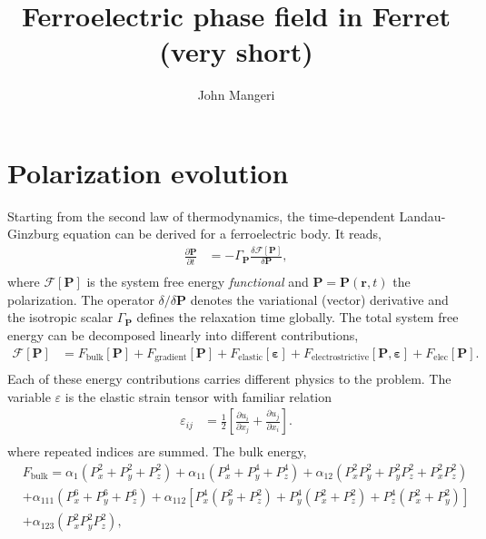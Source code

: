 \documentclass[paper=a4,14pt]{scrartcl} %
\title{Ferroelectric phase field in Ferret (very short)}
\author{John Mangeri}
\begin{document}
\maketitle

\section*{Polarization evolution}
Starting from the second law of thermodynamics, the time-dependent Landau-Ginzburg equation can be derived for a ferroelectric body. It reads,
%
\begin{align}\label{TDLGD}
\frac{\partial \textbf{P}}{\partial t}&= - \Gamma_\textbf{P} \frac{\delta \mathcal{F}[\textbf{P}]}{\delta \textbf{P}} , \\ \nonumber
\end{align}
%
where $\mathcal{F}[\textbf{P}]$ is the system free energy \emph{functional} and $\textbf{P} =  \textbf{P}(\textbf{r},t)$ the polarization. The operator $\delta/\delta \textbf{P}$ denotes the variational (vector) derivative and the isotropic scalar $\Gamma_\textbf{P}$ defines the relaxation time globally. The total system free energy can be decomposed linearly into different contributions,
%
\begin{align}\label{freeE}
\mathcal{F}[\textbf{P}] &= F_\mathrm{bulk}[\textbf{P}] + F_\mathrm{gradient}[\textbf{P}] + F_\mathrm{elastic}[\mathbf{\varepsilon}] + F_\mathrm{electrostrictive}[\textbf{P},\mathbf{\varepsilon}] + F_\mathrm{elec}[\textbf{P}].\\ \nonumber
\end{align}
%
Each of these energy contributions carries different physics to the problem. The variable $\varepsilon$ is the elastic strain tensor with familiar relation
%
\begin{align}\label{strain}
\varepsilon_{ij} &= \frac{1}{2} \left[\frac{\partial u_i}{\partial x_j} +\frac{\partial u_j}{\partial x_i}\right].\\ \nonumber
\end{align}
%
where repeated indices are summed. The bulk energy,
%
\begin{align}\label{bulk}
&F_\mathrm{bulk} =  \alpha_1 \left(P_x^2 + P_y^2 + P_z^2 \right) + \alpha_{11} \left(P_x^4 + P_y^4 + P_z^4 \right) + \alpha_{12} \left(P_x^2 P_y^2 + P_y^2 P_z^2 + P_x^2 P_z^2 \right) \\ \nonumber
&+ \alpha_{111} \left(P_x^6 + P_y^6 + P_z^6 \right) + \alpha_{112} \left[P_x^4 \left(P_y^2 + P_z^2 \right) + P_y^4 \left(P_x^2 + P_z^2 \right) + P_z^4 \left(P_x^2 + P_y^2 \right) \right]  \\ \nonumber
&+ \alpha_{123} \left(P_x^2 P_y^2 P_z^2 \right),\\ \nonumber
\end{align}
\end{document}

